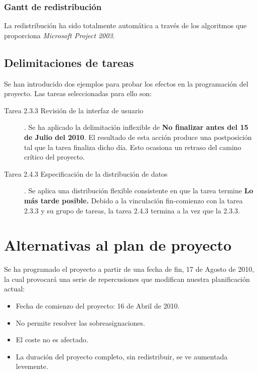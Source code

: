 \documentclass[11pt,a4paper,spanish,twoside]{book}
\begin{document}

\subsection{Gantt de redistribución}
La redistribución ha sido totalmente automática a través de los algoritmos
que proporciona \emph{Microsoft Project 2003}.

\section{Delimitaciones de tareas}
Se han introducido dos ejemplos para probar los efectos en la programación
del proyecto. Las tareas seleccionadas para ello son: 
\begin{description}
\item [Tarea 2.3.3 Revisión de la interfaz de usuario].
 Se ha aplicado la delimitación inflexible de \textbf{No
   finalizar antes del 15 de Julio del 2010}. El resultado de esta acción
 produce una postposición tal que la tarea finaliza dicho día. Esto ocasiona
 un retraso del camino crítico del proyecto.

\item [Tarea 2.4.3 Especificación de la distribución de datos].
 Se aplica una distribución flexible consistente en que la tarea
 termine \textbf{Lo más tarde posible.} Debido a la vinculación fin-comienzo
 con la tarea 2.3.3 y su grupo de tareas, la tarea 2.4.3 termina a la vez que
 la 2.3.3.
\end{description}

\chapter{Alternativas al plan de proyecto}
\newpage
Se ha programado el proyecto a partir de una fecha de fin, 17 de Agosto de
2010, la cual provocará una serie de repercusiones que modifican nuestra
planificación actual: 
\begin{itemize}
\item Fecha de comienzo del proyecto: 16 de Abril de 2010.
\item No permite resolver las sobreasignaciones.
\item El coste no es afectado.
\item La duración del proyecto completo, sin redistribuir, se ve aumentada
  levemente.
\end{itemize}
\end{document}

